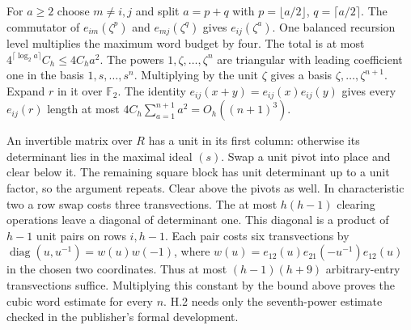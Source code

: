 For $a\ge2$ choose $m\ne i,j$ and split $a=p+q$ with $p=\lfloor a/2\rfloor$, $q=\lceil a/2\rceil$. The commutator of $e_{im}(\zeta^p)$ and $e_{mj}(\zeta^q)$ gives $e_{ij}(\zeta^a)$. One balanced recursion level multiplies the maximum word budget by four. The total is at most $4^{\lceil\log_2 a\rceil} C_h\le4C_h a^2$. The powers $1,\zeta,\ldots,\zeta^n$ are triangular with leading coefficient one in the basis $1,s,\ldots,s^n$. Multiplying by the unit $\zeta$ gives a basis $\zeta,\ldots,\zeta^{n+1}$. Expand $r$ in it over $\mathbb F_2$. The identity $e_{ij}(x+y)=e_{ij}(x)e_{ij}(y)$ gives every $e_{ij}(r)$ length at most $4C_h\sum_{a=1}^{n+1}a^2=O_h((n+1)^3)$.

An invertible matrix over $R$ has a unit in its first column: otherwise its determinant lies in the maximal ideal $(s)$. Swap a unit pivot into place and clear below it. The remaining square block has unit determinant up to a unit factor, so the argument repeats. Clear above the pivots as well. In characteristic two a row swap costs three transvections. The at most $h(h-1)$ clearing operations leave a diagonal of determinant one. This diagonal is a product of $h-1$ unit pairs on rows $i,h-1$. Each pair costs six transvections by $\operatorname{diag}(u,u^{-1})=w(u)w(-1)$, where $w(u)=e_{12}(u)e_{21}(-u^{-1})e_{12}(u)$ in the chosen two coordinates. Thus at most $(h-1)(h+9)$ arbitrary-entry transvections suffice. Multiplying this constant by the bound above proves the cubic word estimate for every $n$. H.2 needs only the seventh-power estimate checked in the publisher's formal development.

